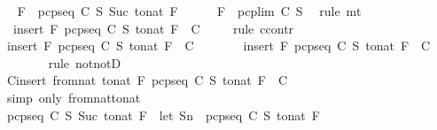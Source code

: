 \begin{isabellebody}
\ \isamarkupfalse%
\ {}{\isacharcolon}{\isachardoublequoteopen}F\ {\isasymnotin}\ pcp{\isacharunderscore}seq\ C\ S\ {\isacharparenleft}Suc\ {\isacharparenleft}to{\isacharunderscore}nat\ F{\isacharparenright}{\isacharparenright}{\isachardoublequoteclose}\isanewline
\ \ \ \ \isamarkupfalse%
\ {\isacartoucheopen}F\ {\isasymnotin}\ pcp{\isacharunderscore}lim\ C\ S{\isacartoucheclose}\ \isamarkupfalse%
\ {\isacharparenleft}rule\ mt{\isacharparenright}\isanewline
\ \ \isamarkupfalse%
\ {}{\isacharcolon}\ {\isachardoublequoteopen}insert\ F\ {\isacharparenleft}pcp{\isacharunderscore}seq\ C\ S\ {\isacharparenleft}to{\isacharunderscore}nat\ F{\isacharparenright}{\isacharparenright}\ {\isasymnotin}\ C{\isachardoublequoteclose}\ \isanewline
\ \ \isamarkupfalse%
\ {\isacharparenleft}rule\ ccontr{\isacharparenright}\isanewline
\ \ \ \ \isamarkupfalse%
\ {\isachardoublequoteopen}{\isasymnot}{\isacharparenleft}insert\ F\ {\isacharparenleft}pcp{\isacharunderscore}seq\ C\ S\ {\isacharparenleft}to{\isacharunderscore}nat\ F{\isacharparenright}{\isacharparenright}\ {\isasymnotin}\ C{\isacharparenright}{\isachardoublequoteclose}\isanewline
\ \ \ \ \isamarkupfalse%
\ \isamarkupfalse%
\ {\isachardoublequoteopen}insert\ F\ {\isacharparenleft}pcp{\isacharunderscore}seq\ C\ S\ {\isacharparenleft}to{\isacharunderscore}nat\ F{\isacharparenright}{\isacharparenright}\ {\isasymin}\ C{\isachardoublequoteclose}\isanewline
\ \ \ \ \ \ \isamarkupfalse%
\ {\isacharparenleft}rule\ notnotD{\isacharparenright}\isanewline
\ \ \ \ \isamarkupfalse%
\ \isamarkupfalse%
\ C{\isacharcolon}{\isachardoublequoteopen}insert\ {\isacharparenleft}from{\isacharunderscore}nat\ {\isacharparenleft}to{\isacharunderscore}nat\ F{\isacharparenright}{\isacharparenright}\ {\isacharparenleft}pcp{\isacharunderscore}seq\ C\ S\ {\isacharparenleft}to{\isacharunderscore}nat\ F{\isacharparenright}{\isacharparenright}\ {\isasymin}\ C{\isachardoublequoteclose}\isanewline
\ \ \ \ \ \ \isamarkupfalse%
\ {\isacharparenleft}simp\ only{\isacharcolon}\ from{\isacharunderscore}nat{\isacharunderscore}to{\isacharunderscore}nat{\isacharparenright}\isanewline
\ \ \ \ \isamarkupfalse%
\ {\isachardoublequoteopen}pcp{\isacharunderscore}seq\ C\ S\ {\isacharparenleft}Suc\ {\isacharparenleft}to{\isacharunderscore}nat\ F{\isacharparenright}{\isacharparenright}\ {\isacharequal}\ {\isacharparenleft}let\ Sn\ {\isacharequal}\ pcp{\isacharunderscore}seq\ C\ S\ {\isacharparenleft}to{\isacharunderscore}nat\ F{\isacharparenright}{\isacharsemicolon}\ \isanewline

\end{isabellebody}

